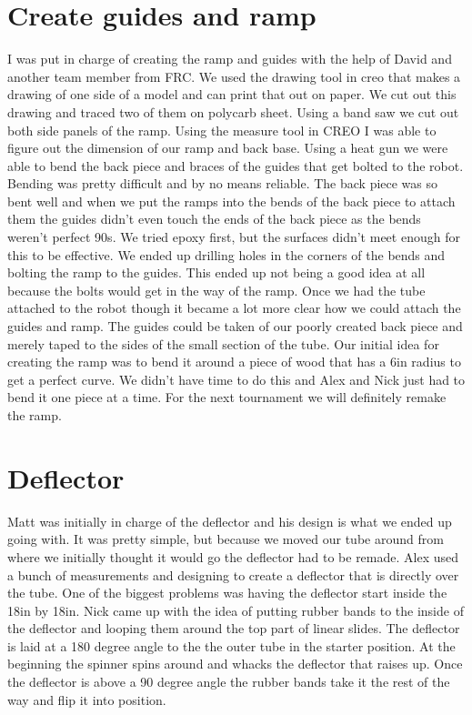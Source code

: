 \section*{Create guides and ramp}
I was put in charge of creating the ramp and guides with the help of David and another team member from FRC. We used the drawing tool in creo that makes a drawing of one side of a model and can print that out on paper. We cut out this drawing and traced two of them on polycarb sheet. Using a band saw we cut out both side panels of the ramp. Using the measure tool in CREO I was able to figure out the dimension of our ramp and back base. Using a heat gun we were able to bend the back piece and braces of the guides that get bolted to the robot. Bending was pretty difficult and by no means reliable. The back piece was so bent well and when we put the ramps into the bends of the back piece to attach them the guides didn’t even touch the ends of the back piece as the bends weren’t perfect 90s. We tried epoxy first, but the surfaces didn’t meet enough for this to be effective. We ended up drilling holes in the corners of the bends and bolting the ramp to the guides. This ended up not being a good idea at all because the bolts would get in the way of the ramp. Once we had the tube attached to the robot though it became a lot more clear how we could attach the guides and ramp. The guides could be taken of our poorly created back piece and merely taped to the sides of the small section of the tube. Our initial idea for creating the ramp was to bend it around a piece of wood that has a 6in radius to get a perfect curve. We didn’t have time to do this and Alex and Nick just had to bend it one piece at a time. For the next tournament we will definitely remake the ramp.

\section*{Deflector}
Matt was initially in charge of the deflector and his design is what we ended up going with. It was pretty simple, but because we moved our tube around from where we initially thought it would go the deflector had to be remade. Alex used a bunch of measurements and designing to create a deflector that is directly over the tube. One of the biggest problems was having the deflector start inside the 18in by 18in. Nick came up with the idea of putting rubber bands to the inside of the deflector and looping them around the top part of linear slides. The deflector is laid at a 180 degree angle to the the outer tube in the starter position. At the beginning the spinner spins around and whacks the deflector that raises up. Once the deflector is above a 90 degree angle the rubber bands take it the rest of the way and flip it into position. 

